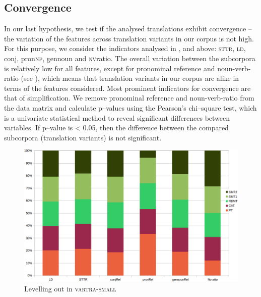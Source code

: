\documentclass[output=paper]{LSP/langsci}
\begin{document}
\subsection{Convergence}

In our last hypothesis, we test if the analysed translations exhibit convergence – the variation of the features across translation variants in our corpus is not high. For this purpose, we consider the indicators analysed in ,  and  above: \textsc{sttr}, \textsc{ld}, conj, pron\textsc{np}, gennoun and \textsc{nv}ratio. The overall variation between the subcorpora is relatively low for all features, except for pronominal reference and noun-verb-ratio (see ), which means that translation variants in our corpus are alike in terms of the features considered.  Most prominent indicators for convergence are that of simplification.  We remove pronominal reference and noun-verb-ratio from the data matrix and calculate p--values using the Pearson’s chi--square test, which is a univariate statistical method to reveal significant differences between variables. If p--value is < 0.05, then the difference between the compared subcorpora (translation variants) is not significant.

\begin{figure}
\includegraphics[width=1.0\textwidth]{./figures/5-1.png}
\caption{Levelling out in \textsc{vartra}-\textsc{small}} \label{fig:4:1}
\end{figure} 
\end{document}
